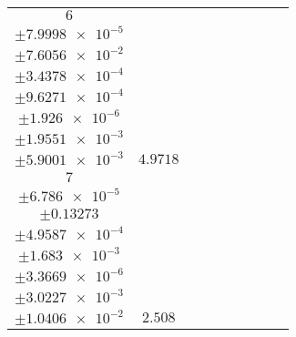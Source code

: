 \documentclass[8pt]{article}
\begin{document}
\begin{longtable}[l]{c c c c c c c c c}
$\num{6}$ & \begin{tabular}[c]{@{}c@{}}$\num{6.3748e-2}$ \\ $\pm\num{7.9998e-5}$\end{tabular} & \begin{tabular}[c]{@{}c@{}}$\num{0.31076}$ \\ $\pm\num{7.6056e-2}$\end{tabular} & \begin{tabular}[c]{@{}c@{}}$\num{7.3997}$ \\ $\pm\num{3.4378e-4}$\end{tabular} & \begin{tabular}[c]{@{}c@{}}$\num{1.865e+3}$ \\ $\pm\num{9.6271e-4}$\end{tabular} & \begin{tabular}[c]{@{}c@{}}$\num{3.7309}$ \\ $\pm\num{1.926e-6}$\end{tabular} & \begin{tabular}[c]{@{}c@{}}$\num{1.4363}$ \\ $\pm\num{1.9551e-3}$\end{tabular} & \begin{tabular}[c]{@{}c@{}}$\num{4.405}$ \\ $\pm\num{5.9001e-3}$\end{tabular} & $\num{4.9718}$\\
$\num{7}$ & \begin{tabular}[c]{@{}c@{}}$\num{2.9836e-2}$ \\ $\pm\num{6.786e-5}$\end{tabular} & \begin{tabular}[c]{@{}c@{}}$\num{0.26551}$ \\ $\pm\num{0.13273}$\end{tabular} & \begin{tabular}[c]{@{}c@{}}$\num{9.0996}$ \\ $\pm\num{4.9587e-4}$\end{tabular} & \begin{tabular}[c]{@{}c@{}}$\num{1.8667e+3}$ \\ $\pm\num{1.683e-3}$\end{tabular} & \begin{tabular}[c]{@{}c@{}}$\num{3.7343}$ \\ $\pm\num{3.3669e-6}$\end{tabular} & \begin{tabular}[c]{@{}c@{}}$\num{1.1435}$ \\ $\pm\num{3.0227e-3}$\end{tabular} & \begin{tabular}[c]{@{}c@{}}$\num{4.1923}$ \\ $\pm\num{1.0406e-2}$\end{tabular} & $\num{2.508}$\\

\end{longtable}
\end{document}
